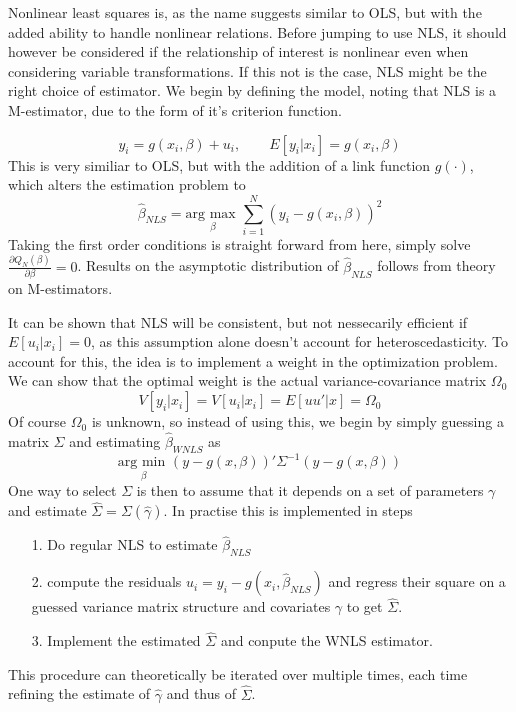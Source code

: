 Nonlinear least squares is, as the name suggests similar to OLS, but with the added ability to handle nonlinear relations. Before jumping to use NLS, it should however be considered if the relationship of interest is nonlinear even when considering variable transformations. If this not is the case, NLS might be the right choice of estimator. We begin by defining the model, noting that NLS is a M-estimator, due to the form of it's criterion function.

\begin{equation}
y_i = g(x_i, \beta) + u_i, \qquad E[y_i | x_i] = g(x_i, \beta)
\end{equation}
This is very similiar to OLS, but with the addition of a link function $g(\cdot)$, which alters the estimation problem to
\begin{equation}
\hat{\beta}_{NLS} = \underset{\beta}{\textrm{arg max }} \sum_{i=1}^N (y_i - g(x_i, \beta))^2
\end{equation}
Taking the first order conditions is straight forward from here, simply solve $\frac{\partial Q_N(\beta)}{\partial \beta} = 0$. Results on the asymptotic distribution of $\hat{\beta}_{NLS}$ follows from theory on M-estimators.

It can be shown that NLS will be consistent, but not nessecarily efficient if $E[u_i | x_i]=0$, as this assumption alone doesn't account for heteroscedasticity. To account for this, the idea is to implement a weight in the optimization problem. We can show that the optimal weight is the actual variance-covariance matrix $\Omega_0$
\begin{equation}
V[y_i | x_i] = V[u_i|x_i] = E[uu'|x] = \Omega_0
\end{equation}
Of course $\Omega_0$ is unknown, so instead of using this, we begin by simply guessing a matrix $\Sigma$ and estimating $\hat{\beta}_{WNLS}$ as
\begin{equation}
\underset{\beta}{\textrm{arg min }} (y-g(x,\beta))'\Sigma^{-1}(y-g(x,\beta))
\end{equation}
One way to select $\Sigma$ is then to assume that it depends on a set of parameters $\gamma$ and estimate $\hat{\Sigma}=\Sigma(\hat{\gamma})$. In practise this is implemented in steps
\begin{itemize}
\item[1.] Do regular NLS to estimate $\hat{\beta}_{NLS}$
\item[2.] compute the residuals $\hat{u}_i = y_i - g(x_i, \hat{\beta}_{NLS})$ and regress their square on a guessed variance matrix structure and covariates $\gamma$ to get $\hat{\Sigma}$.
\item[3.] Implement the estimated $\hat{\Sigma}$ and conpute the WNLS estimator.
\end{itemize}
This procedure can theoretically be iterated over multiple times, each time refining the estimate of $\hat{\gamma}$ and thus of $\hat{\Sigma}$.
